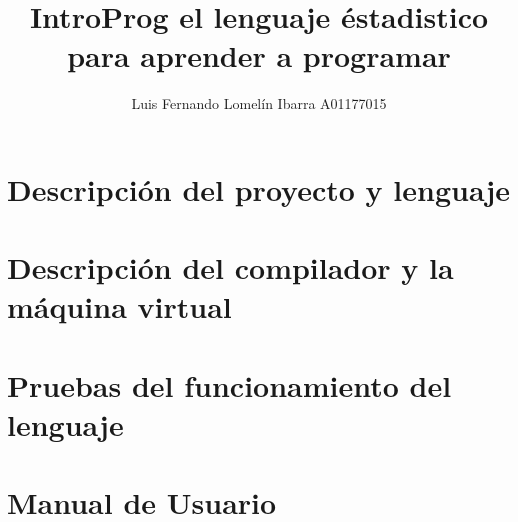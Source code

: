 \documentclass[krantz1,ChapterTOCs, spanish]{krantz}
\begin{document}
\frontmatter

\title{IntroProg el lenguaje éstadistico para aprender a programar 
}
\author{Luis Fernando Lomelín Ibarra A01177015}

\maketitle


\cleardoublepage
\setcounter{page}{7} %
\tableofcontents
%
%
%
%

\mainmatter

\part{Descripción del proyecto y lenguaje}



%

\part{Descripción del compilador y la máquina virtual}




\part{Pruebas del funcionamiento del lenguaje}


\part{Manual de Usuario}

\end{document}
